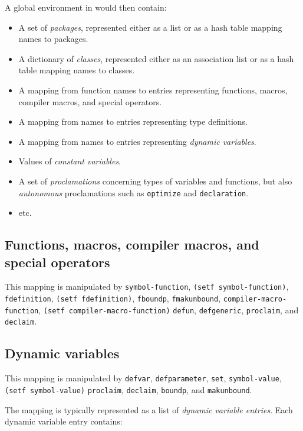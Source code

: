 A global environment in \sysname{} would then contain:

\begin{itemize}
\item A set of \emph{packages}, represented either as a list or as a
  hash table mapping names to packages.
\item A dictionary of \emph{classes}, represented either as an
  association list or as a hash table mapping names to classes.
\item A mapping from function names to entries representing functions,
  macros, compiler macros, and special operators.
\item A mapping from names to entries representing type definitions.
\item A mapping from names to entries representing \emph{dynamic variables}.
\item Values of \emph{constant variables}.
\item A set of \emph{proclamations} concerning types of variables and
  functions, but also \emph{autonomous} proclamations such as
  \texttt{optimize} and \texttt{declaration}.
\item etc.
\end{itemize}

\subsection{Functions, macros, compiler macros, and special operators}

This mapping is manipulated by \texttt{symbol-function}, \texttt{(setf
  symbol-function)}, \texttt{fdefinition}, \texttt{(setf
  fdefinition)}, \texttt{fboundp}, \texttt{fmakunbound},
\texttt{compiler-macro-function}, \texttt{(setf compiler-macro-function)}
\texttt{defun}, \texttt{defgeneric}, \texttt{proclaim}, and
\texttt{declaim}.

\subsection{Dynamic variables}

This mapping is manipulated by \texttt{defvar}, \texttt{defparameter},
\texttt{set}, \texttt{symbol-value}, \texttt{(setf symbol-value)}
\texttt{proclaim}, \texttt{declaim}, \texttt{boundp}, and
\texttt{makunbound}.

The mapping is typically represented as a list of \emph{dynamic
  variable entries}.  Each dynamic variable entry contains:

